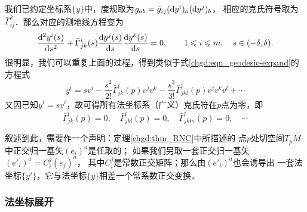 


我们已约定坐标系$\{y\}$中，度规取为$g_{ab}=\bar{g}_{ij}({\rm d}y^i)_a({\rm d}y^j)_b$，
相应的克氏符号取为$\bar{\Gamma}^k_{ij}$．那么对应的测地线方程变为
\begin{equation}\label{chgd:eqn_geodesic-formula-RNC}
    \frac{{\rm d}^2 y^i(s)}{{\rm d}s^2} + \bar{\Gamma}_{jk}^i(s)
    \frac{{\rm d}y^j(s)}{{\rm d} s} \frac{{\rm d}y^k(s)}{{\rm d} s} =0,
    \qquad 1 \leqslant i \leqslant m , \quad s\in (-\delta,\delta).
\end{equation}
很明显，我们可以重复上面的过程，得到类似于式\eqref{chgd:eqn_geodesic-expand}的方程式
\begin{equation}\label{chgd:eqn_geodesic-expand-RNC}
    y^i =  s v^i  - \frac{s^2}{2!} \bar{\Gamma}_{jk}^i(p) v^j v^k
    - \frac{s^3}{3!}  \bar{\Gamma}^{i}_{jkl}(p) v^j v^k v^l + \cdots
\end{equation}
又因已知$y^i =  s v^i$，故可得所有法坐标系（广义）克氏符在$p$点为零，即
\begin{equation}\label{chgd:eqn_Christoffel=0-RNC}
    \bar{\Gamma}^i_{jk}(p)   =0, \quad
    \bar{\Gamma}^i_{jkl}(p)  =0, \quad
    \bar{\Gamma}^i_{jkln}(p) =0, \quad\cdots
\end{equation}

叙述到此，需要作一个声明：定理\ref{chgd:thm_RNC}中所描述的
点$p$处切空间$T_pM$中正交归一基矢$(e_i)^a$是任取的；
如果我们另取一套正交归一基矢$(e'_i)^a=C_i^j(e_j)^a$，
其中$C_i^j$是常数正交矩阵；那么由$(e'_i)^a$也会诱导出
一套法坐标$\{y'\}$，它与法坐标$\{y\}$相差一个常系数正交变换．

\subsubsection{法坐标展开}

